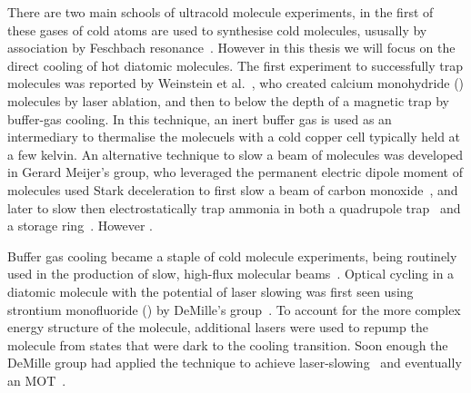 There are two main schools of ultracold molecule experiments, in the first of
these gases of cold atoms are used to synthesise cold molecules, ususally by
association by Feschbach resonance~\cite{Moses2017,PhysRevA.89.033604}. However
in this thesis we will focus on the direct cooling of hot diatomic molecules.
The first experiment to successfully trap molecules was reported by Weinstein
et al.~\cite{Weinstein1998}, who created calcium monohydride (\CaH{}) molecules
by laser ablation, and then to below the depth of a magnetic trap by buffer-gas
cooling. In this technique, an inert buffer gas is used as an intermediary to
thermalise the molecuels with a cold copper cell typically held at a few
kelvin.
%
An alternative technique to slow a beam of molecules was developed in Gerard
Meijer's group, who leveraged the permanent electric dipole moment of molecules
used Stark deceleration to first slow a beam of carbon
monoxide~\cite{Bethlem1999}, and later to slow then electrostatically trap
ammonia in both a quadrupole trap~\cite{Bethlem2000} and a storage
ring~\cite{Crompvoets2001, Crompvoets2005}.  However .

Buffer gas cooling became a staple of cold molecule experiments, being
routinely used in the production of slow, high-flux molecular
beams~\cite{Maxwell2005, Barry2011}.
Optical cycling in a diatomic molecule with the potential of laser slowing was
first seen using strontium monofluoride (\SrF{}) by DeMille's
group~\cite{Shuman2009}. To account for the more complex energy structure of
the molecule, additional lasers were used to repump the molecule from states
that were dark to the cooling transition.
Soon enough the DeMille group had applied the technique to achieve
laser-slowing~\cite{PhysRevLett.108.103002} and eventually an \SrF{}
MOT~\cite{Barry2014, PhysRevLett.116.063004}. 

